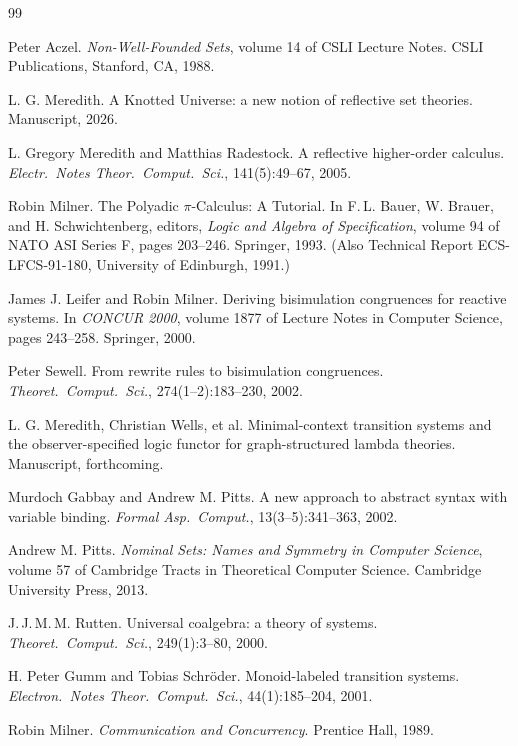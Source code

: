 \documentclass[11pt]{article}
\theoremstyle{plain}
\theoremstyle{definition}
\begin{document}
\begin{thebibliography}{99}

 Peter Aczel. \emph{Non-Well-Founded Sets}, volume 14 of CSLI
Lecture Notes. CSLI Publications, Stanford, CA, 1988.

 L. G. Meredith. A Knotted Universe: a new notion of reflective set
theories. Manuscript, 2026.

 L. Gregory Meredith and Matthias Radestock. A reflective
higher-order calculus. \emph{Electr.\ Notes Theor.\ Comput.\ Sci.},
141(5):49--67, 2005.

 Robin Milner. The Polyadic $\pi$-Calculus: A Tutorial. In
F.\,L. Bauer, W. Brauer, and H. Schwichtenberg, editors, \emph{Logic and Algebra
of Specification}, volume 94 of NATO ASI Series F, pages 203--246. Springer, 1993.
(Also Technical Report ECS-LFCS-91-180, University of Edinburgh, 1991.)

 James J. Leifer and Robin Milner. Deriving bisimulation
congruences for reactive systems. In \emph{CONCUR 2000}, volume 1877 of Lecture
Notes in Computer Science, pages 243--258. Springer, 2000.

 Peter Sewell. From rewrite rules to bisimulation congruences.
\emph{Theoret.\ Comput.\ Sci.}, 274(1--2):183--230, 2002.

 L. G. Meredith, Christian Wells, et al. Minimal-context
transition systems and the observer-specified logic functor for graph-structured
lambda theories. Manuscript, forthcoming.

 Murdoch Gabbay and Andrew M. Pitts. A new approach to abstract syntax
with variable binding. \emph{Formal Asp.\ Comput.}, 13(3--5):341--363, 2002.

 Andrew M. Pitts. \emph{Nominal Sets: Names and Symmetry in
Computer Science}, volume 57 of Cambridge Tracts in Theoretical Computer Science.
Cambridge University Press, 2013.

 J.\,J.\,M.\,M. Rutten. Universal coalgebra: a theory of systems.
\emph{Theoret.\ Comput.\ Sci.}, 249(1):3--80, 2000.

 H. Peter Gumm and Tobias Schr\"oder. Monoid-labeled
transition systems. \emph{Electron.\ Notes Theor.\ Comput.\ Sci.}, 44(1):185--204,
2001.

 Robin Milner. \emph{Communication and Concurrency}. Prentice
Hall, 1989.


\end{thebibliography}
\end{document}

